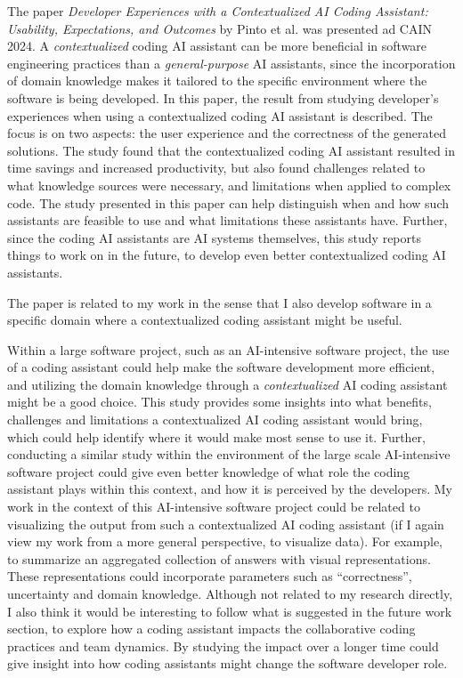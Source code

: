 \documentclass[11pt]{article}
\begin{document}
The paper \textit{Developer Experiences with a Contextualized AI Coding Assistant: Usability, Expectations, and Outcomes} by Pinto et al. \cite{pinto_developer_experience_with_a_contextualized_AI_coding_assistant} was presented ad CAIN 2024. 
A \emph{contextualized} coding AI assistant can be more beneficial in software engineering practices than a \emph{general-purpose} AI assistants, since the incorporation of domain knowledge makes it tailored to the specific environment where the software is being developed.
In this paper, the result from studying developer's experiences when using a contextualized coding AI assistant is described. The focus is on two aspects: the user experience and the correctness of the generated solutions. The study found that the contextualized coding AI assistant resulted in time savings and increased productivity, but also found challenges related to what knowledge sources were necessary, and limitations when applied to complex code.
The study presented in this paper can help distinguish when and how such assistants are feasible to use and what limitations these assistants have.
Further, since the coding AI assistants are AI systems themselves, this study reports things to work on in the future, to develop even better contextualized coding AI assistants.

The paper is related to my work in the sense that I also develop software in a specific domain where a contextualized coding assistant might be useful. 

Within a large software project, such as an AI-intensive software project, the use of a coding assistant could help make the software development more efficient, and utilizing the domain knowledge through a \emph{contextualized} AI coding assistant might be a good choice.
This study provides some insights into what benefits, challenges and limitations a contextualized AI coding assistant would bring, which could help identify where it would make most sense to use it. Further, conducting a similar study within the environment of the large scale AI-intensive software project could give even better knowledge of what role the coding assistant plays within this context, and how it is perceived by the developers.
My work in the context of this AI-intensive software project could be related to visualizing the output from such a contextualized AI coding assistant (if I again view my work from a more general perspective, to visualize data). 
For example, to summarize an aggregated collection of answers with visual representations. These representations could incorporate parameters such as ``correctness'', uncertainty and domain knowledge.
Although not related to my research directly, I also think it would be interesting to follow what is suggested in the future work section, to explore how a coding assistant impacts the collaborative coding practices and team dynamics. 
By studying the impact over a longer time could give insight into how coding assistants might change the software developer role.
\end{document}
